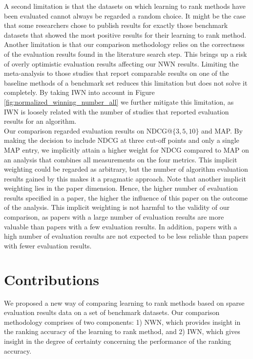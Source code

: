 \documentclass{sig-alternate}
\begin{document}
A second limitation is that the datasets on which learning to rank methods have been evaluated cannot always be regarded a random choice. It might be the case that some researchers chose to publish results for exactly those benchmark datasets that showed the most positive results for their learning to rank method.\\

Another limitation is that our comparison methodology relies on the correctness of the evaluation results found in the literature search step. This brings up a risk of overly optimistic evaluation results affecting our NWN results. Limiting the meta-analysis to those studies that report comparable results on one of the baseline methods of a benchmark set reduces this limitation but does not solve it completely. By taking IWN into account in Figure \ref{fig:normalized_winning_number_all} we further mitigate this limitation, as IWN is loosely related with the number of studies that reported evaluation results for an algorithm.\\

Our comparison regarded evaluation results on NDCG@$\{3,5,10\}$ and MAP. By making the decision to include NDCG at three cut-off points and only a single MAP entry, we implicitly attain a higher weight for NDCG compared to MAP on an analysis that combines all measurements on the four metrics. This implicit weighting could be regarded as arbitrary, but the number of algorithm evaluation results gained by this makes it a pragmatic approach. Note that another implicit weighting lies in the paper dimension. Hence, the higher number of evaluation results specified in a paper, the higher the influence of this paper on the outcome of the analysis. This implicit weighting is not harmful to the validity of our comparison, as papers with a large number of evaluation results are more valuable than papers with a few evaluation results. In addition, papers with a high number of evaluation results are not expected to be less reliable than papers with fewer evaluation results.

\section{Contributions}
We proposed a new way of comparing learning to rank methods based on sparse evaluation results data on a set of benchmark datasets. Our comparison methodology comprises of two components: 1) NWN, which provides insight in the ranking accuracy of the learning to rank method, and 2) IWN, which gives insight in the degree of certainty concerning the performance of the ranking accuracy.\\
\end{document}
